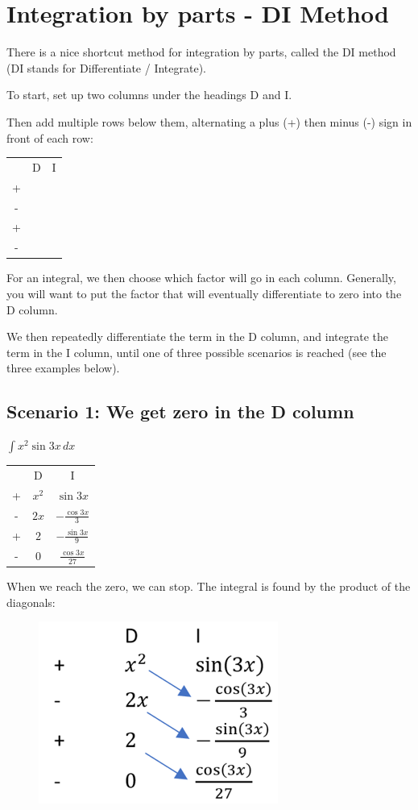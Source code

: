 \documentclass[../main.tex]{subfiles}
\begin{document}
\section{Integration by parts - DI Method}
There is a nice shortcut method for integration by parts, called the DI method (DI stands for Differentiate / Integrate).

To start, set up two columns under the headings D and I. 

Then add multiple rows below them, alternating a plus (+) then minus (-) sign in front of each row:

\begin{tabular}{ c c c }
   & D & I \\ 
 + &  &  \\  
 - &  & \\
  + &  &  \\  
 - &  & \\
\end{tabular}

For an integral, we then choose which factor will go in each column. Generally, you will want to put the factor that will eventually differentiate to zero into the D column.

We then repeatedly differentiate the term in the D column, and integrate the term in the I column, until one of three possible scenarios is reached (see the three examples below).

\subsection*{Scenario 1: We get zero in the D column}
\(\int x^2 \sin{3x}\, dx\)

\begin{tabular}{ c c c }
   & D & I \\ 
 +  & $x^2$ &$\sin{3x}$ \\  
 - & $2x$ & $-\frac{\cos{3x}}{3}$\\
  + & $2$ & $-\frac{\sin{3x}}{9}$ \\  
 - & $0$ & $\frac{\cos{3x}}{27}$\\
\end{tabular}

When we reach the zero, we can stop. The integral is found by the product of the diagonals:
\begin{figure}[h]
    
    \includegraphics[width=0.22\linewidth]{images/dimethod1.png}
\end{figure}
\end{document}
